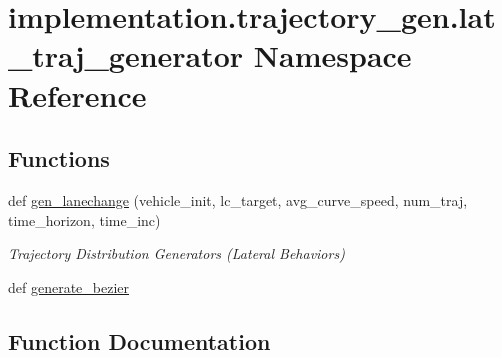 \hypertarget{namespaceimplementation_1_1trajectory__gen_1_1lat__traj__generator}{}\section{implementation.\+trajectory\+\_\+gen.\+lat\+\_\+traj\+\_\+generator Namespace Reference}
\label{namespaceimplementation_1_1trajectory__gen_1_1lat__traj__generator}
\subsection*{Functions}
\begin{DoxyCompactItemize}
\item 
def \hyperlink{namespaceimplementation_1_1trajectory__gen_1_1lat__traj__generator_a0f99cc2458b8cc4499d8acaa4dfa48bb}{gen\+\_\+lanechange} (vehicle\+\_\+init, lc\+\_\+target, avg\+\_\+curve\+\_\+speed, num\+\_\+traj, time\+\_\+horizon, time\+\_\+inc)
\begin{DoxyCompactList}\small\item\em Trajectory Distribution Generators (Lateral Behaviors) \end{DoxyCompactList}\item 
def \hyperlink{namespaceimplementation_1_1trajectory__gen_1_1lat__traj__generator_a08f872c8f989fac4214e8b5f623a8c55}{generate\+\_\+bezier}
\end{DoxyCompactItemize}


\subsection{Function Documentation}
\mbox{\label{namespaceimplementation_1_1trajectory__gen_1_1lat__traj__generator_a0f99cc2458b8cc4499d8acaa4dfa48bb}} 
